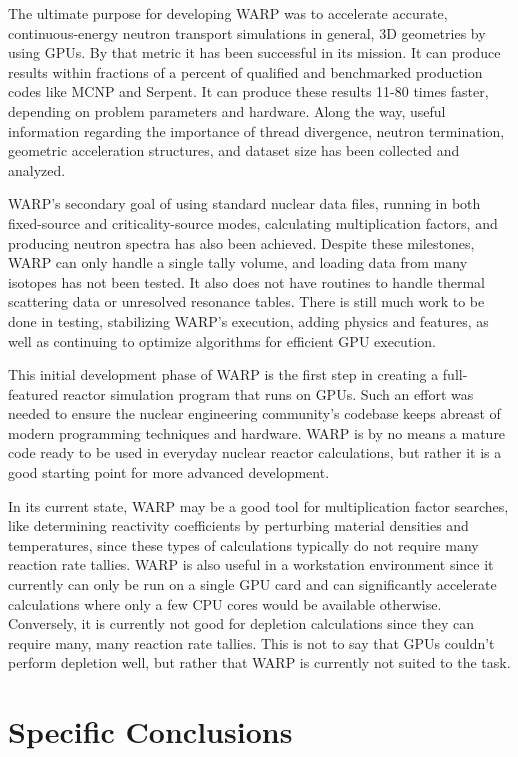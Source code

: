 The ultimate purpose for developing WARP was to accelerate accurate, continuous-energy neutron transport simulations in general, 3D geometries by using GPUs.  By that metric it has been successful in its mission.  It can produce results within fractions of a percent of qualified and benchmarked production codes like MCNP and Serpent.  It can produce these results 11-80 times faster, depending on problem parameters and hardware.  Along the way, useful information regarding the importance of thread divergence, neutron termination, geometric acceleration structures, and dataset size has been collected and analyzed.

WARP's secondary goal of using standard nuclear data files, running in both fixed-source and criticality-source modes, calculating multiplication factors, and producing neutron spectra has also been achieved.  Despite these milestones, WARP can only handle a single tally volume, and loading data from many isotopes has not been tested.  It also does not have routines to handle thermal scattering data or unresolved resonance tables. There is still much work to be done in testing, stabilizing WARP's execution, adding physics and features, as well as continuing to optimize algorithms for efficient GPU execution.

This initial development phase of WARP is the first step in creating a full-featured reactor simulation program that runs on GPUs.  Such an effort was needed to ensure the nuclear engineering community's codebase keeps abreast of modern programming techniques and hardware.  WARP is by no means a mature code ready to be used in everyday nuclear reactor calculations, but rather it is a good starting point for more advanced development.  

In its current state, WARP may be a good tool for multiplication factor searches, like determining reactivity coefficients by perturbing material densities and temperatures, since these types of calculations typically do not require many reaction rate tallies.  WARP is also useful in a workstation environment since it currently can only be run on a single GPU card and can significantly accelerate calculations where only a few CPU cores would be available otherwise.  Conversely, it is currently not good for depletion calculations since they can require many, many reaction rate tallies.  This is not to say that GPUs couldn't perform depletion well, but rather that WARP is currently not suited to the task.

\section{Specific Conclusions}


